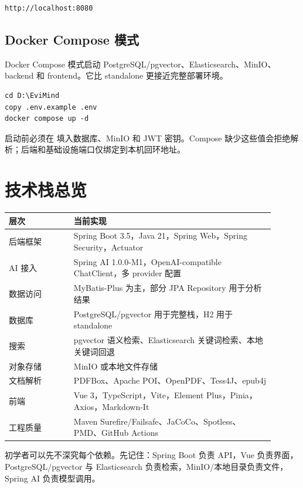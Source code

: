 \documentclass[UTF8,zihao=-4]{ctexart}
\begin{document}
\begin{lstlisting}[style=code]
http://localhost:8080
\end{lstlisting}

\subsection{Docker Compose 模式}

Docker Compose 模式启动 PostgreSQL/pgvector、Elasticsearch、MinIO、backend 和 frontend。它比 standalone 更接近完整部署环境。

\begin{lstlisting}[style=code]
cd D:\EviMind
copy .env.example .env
docker compose up -d
\end{lstlisting}

启动前必须在  填入数据库、MinIO 和 JWT 密钥。Compose 缺少这些值会拒绝解析；后端和基础设施端口仅绑定到本机回环地址。

\section{技术栈总览}

\begin{longtable}{L{0.22\linewidth}L{0.68\linewidth}}
\toprule
层次 & 当前实现 \\
\midrule
后端框架 & Spring Boot 3.5，Java 21，Spring Web，Spring Security，Actuator \\
AI 接入 & Spring AI 1.0.0-M1，OpenAI-compatible ChatClient，多 provider 配置 \\
数据访问 & MyBatis-Plus 为主，部分 JPA Repository 用于分析结果 \\
数据库 & PostgreSQL/pgvector 用于完整栈，H2 用于 standalone \\
搜索 & pgvector 语义检索、Elasticsearch 关键词检索、本地关键词回退 \\
对象存储 & MinIO 或本地文件存储 \\
文档解析 & PDFBox、Apache POI、OpenPDF、Tess4J、epub4j \\
前端 & Vue 3，TypeScript，Vite，Element Plus，Pinia，Axios，Markdown-It \\
工程质量 & Maven Surefire/Failsafe、JaCoCo、Spotless、PMD、GitHub Actions \\
\bottomrule
\end{longtable}

初学者可以先不深究每个依赖。先记住：Spring Boot 负责 API，Vue 负责界面，PostgreSQL/pgvector 与 Elasticsearch 负责检索，MinIO/本地目录负责文件，Spring AI 负责模型调用。
\end{document}
